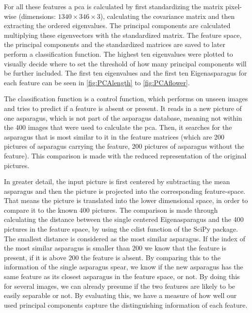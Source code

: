 
\bigskip
For all these features a \acrshort{pca} is calculated by first standardizing the matrix pixel-wise (dimensions: $1340\times346\times3$), calculating the covariance matrix and then extracting the ordered eigenvalues. The principal components are calculated multiplying these eigenvectors with the standardized matrix. The feature space, the principal components and the standardized matrices are saved to later perform a classification function. The highest ten eigenvalues were plotted to visually decide where to set the threshold of how many principal components will be further included. The first ten eigenvalues and the first ten Eigenasparagus for each feature can be seen in \autoref{fig:PCAlength} to \autoref{fig:PCAflower}.

The classification function is a control function, which performs on unseen images and tries to predict if a feature is absent or present. It reads in a new picture of one asparagus, which is not part of the asparagus database, meaning not within the 400 images that were used to calculate the \acrshort{pca}. Then, it searches for the asparagus that is most similar to it in the feature matrices (which are 200 pictures of asparagus carrying the feature, 200 pictures of asparagus without the feature).  This comparison is made with the reduced representation of the original pictures.

In greater detail, the input picture is first centered by subtracting the mean asparagus and then the picture is projected into the corresponding feature-space. That means the picture is translated into the lower dimensional space, in order to compare it to the known 400 pictures. The comparison is made through calculating the distance between the single centered Eigenasparagus and the 400 pictures in the feature space, by using the cdist function of the SciPy package. The smallest distance is considered as the most similar asparagus. If the index of the most similar asparagus is smaller than 200 we know that the feature is present, if it is above 200 the feature is absent. By comparing this to the information of the single asparagus spear, we know if the new asparagus has the same feature as its closest asparagus in the feature space, or not. By doing this for several images, we can already presume if the two features are likely to be easily separable or not. By evaluating this, we have a measure of how well our used principal components capture the distinguishing information of each feature.

